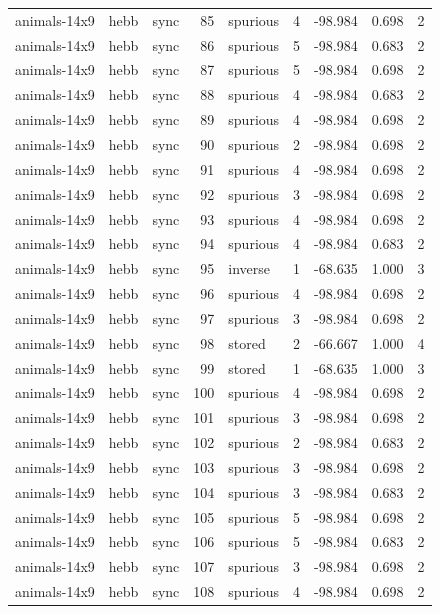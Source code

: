 \begin{tabular}{lllrlrrrr}
animals-14x9 & hebb & sync & 85 & spurious & 4 & -98.984 & 0.698 & 2 \\
animals-14x9 & hebb & sync & 86 & spurious & 5 & -98.984 & 0.683 & 2 \\
animals-14x9 & hebb & sync & 87 & spurious & 5 & -98.984 & 0.698 & 2 \\
animals-14x9 & hebb & sync & 88 & spurious & 4 & -98.984 & 0.683 & 2 \\
animals-14x9 & hebb & sync & 89 & spurious & 4 & -98.984 & 0.698 & 2 \\
animals-14x9 & hebb & sync & 90 & spurious & 2 & -98.984 & 0.698 & 2 \\
animals-14x9 & hebb & sync & 91 & spurious & 4 & -98.984 & 0.698 & 2 \\
animals-14x9 & hebb & sync & 92 & spurious & 3 & -98.984 & 0.698 & 2 \\
animals-14x9 & hebb & sync & 93 & spurious & 4 & -98.984 & 0.698 & 2 \\
animals-14x9 & hebb & sync & 94 & spurious & 4 & -98.984 & 0.683 & 2 \\
animals-14x9 & hebb & sync & 95 & inverse & 1 & -68.635 & 1.000 & 3 \\
animals-14x9 & hebb & sync & 96 & spurious & 4 & -98.984 & 0.698 & 2 \\
animals-14x9 & hebb & sync & 97 & spurious & 3 & -98.984 & 0.698 & 2 \\
animals-14x9 & hebb & sync & 98 & stored & 2 & -66.667 & 1.000 & 4 \\
animals-14x9 & hebb & sync & 99 & stored & 1 & -68.635 & 1.000 & 3 \\
animals-14x9 & hebb & sync & 100 & spurious & 4 & -98.984 & 0.698 & 2 \\
animals-14x9 & hebb & sync & 101 & spurious & 3 & -98.984 & 0.698 & 2 \\
animals-14x9 & hebb & sync & 102 & spurious & 2 & -98.984 & 0.683 & 2 \\
animals-14x9 & hebb & sync & 103 & spurious & 3 & -98.984 & 0.698 & 2 \\
animals-14x9 & hebb & sync & 104 & spurious & 3 & -98.984 & 0.683 & 2 \\
animals-14x9 & hebb & sync & 105 & spurious & 5 & -98.984 & 0.698 & 2 \\
animals-14x9 & hebb & sync & 106 & spurious & 5 & -98.984 & 0.683 & 2 \\
animals-14x9 & hebb & sync & 107 & spurious & 3 & -98.984 & 0.698 & 2 \\
animals-14x9 & hebb & sync & 108 & spurious & 4 & -98.984 & 0.698 & 2 \\

\end{tabular}
